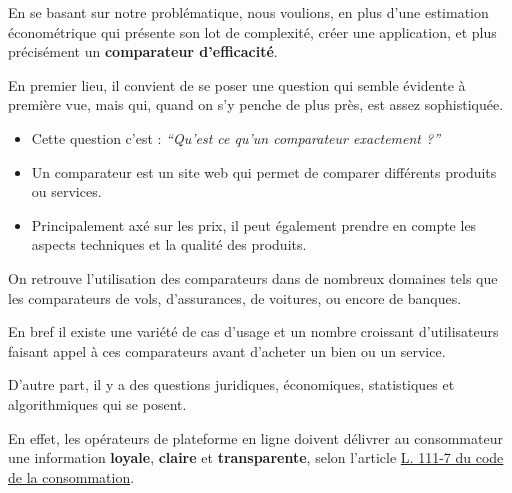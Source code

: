 \documentclass[
  12pt,
]{report}
\providecommand{\tightlist}{%
  \setlength{\itemsep}{0pt}\setlength{\parskip}{0pt}}\usepackage{longtable,booktabs,array}
\begin{document}
En se basant sur notre problématique, nous voulions, en plus d'une
estimation économétrique qui présente son lot de complexité, créer une
application, et plus précisément un \textbf{comparateur d'efficacité}.

En premier lieu, il convient de se poser une question qui semble
évidente à première vue, mais qui, quand on s'y penche de plus près, est
assez sophistiquée.

\begin{itemize}
\tightlist
\item
  Cette question c'est : \emph{``Qu'est ce qu'un comparateur exactement
  ?''}
\end{itemize}

\begin{tcolorbox}[enhanced jigsaw, leftrule=.75mm, toprule=.15mm, rightrule=.15mm, opacityback=0, opacitybacktitle=0.6, colframe=quarto-callout-tip-color-frame, breakable, colback=white, colbacktitle=quarto-callout-tip-color!10!white, coltitle=black, title=\textcolor{quarto-callout-tip-color}{\faLightbulb}\hspace{0.5em}{Définition}, arc=.35mm, bottomtitle=1mm, toptitle=1mm, titlerule=0mm, bottomrule=.15mm, left=2mm]

\begin{itemize}
\item
  Un comparateur est un site web qui permet de comparer différents
  produits ou services.
\item
  Principalement axé sur les prix, il peut également prendre en compte
  les aspects techniques et la qualité des produits.
\end{itemize}

\end{tcolorbox}

On retrouve l'utilisation des comparateurs dans de nombreux domaines
tels que les comparateurs de vols, d'assurances, de voitures, ou encore
de banques.

En bref il existe une variété de cas d'usage et un nombre croissant
d'utilisateurs faisant appel à ces comparateurs avant d'acheter un bien
ou un service.

D'autre part, il y a des questions juridiques, économiques, statistiques
et algorithmiques qui se posent.

En effet, les opérateurs de plateforme en ligne doivent délivrer au
consommateur une information \textbf{loyale}, \textbf{claire} et
\textbf{transparente}, selon l'article
\href{https://www.legifrance.gouv.fr/codes/article_lc/LEGIARTI000033219601}{L.
111-7 du code de la consommation}.
\end{document}
